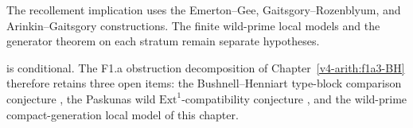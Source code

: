 The recollement implication uses the Emerton--Gee,
Gaitsgory--Rozenblyum, and Arinkin--Gaitsgory constructions.
The finite wild-prime local models and the generator theorem on each
stratum remain separate hypotheses.

\begin{remark}
\label{v4-arith:w5-g:f1a3-C:rem:F1a-reduction}
 is conditional. The
F1.a obstruction decomposition of Chapter~\ref{v4-arith:f1a3-BH} therefore
retains three open items: the Bushnell--Henniart type-block comparison
conjecture , the Paskunas
wild \(\mathrm{Ext}^{1}\)-compatibility conjecture
, and the wild-prime
compact-generation local model of this chapter.
\end{remark}
